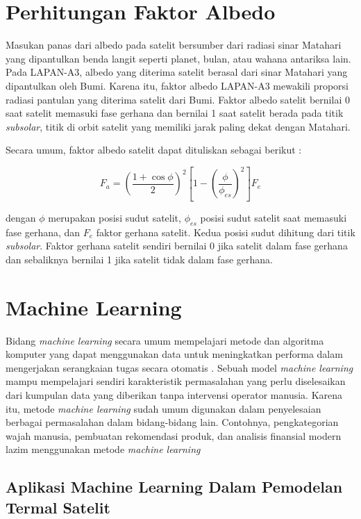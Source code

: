 \section{Perhitungan Faktor Albedo}

Masukan panas dari albedo pada satelit bersumber dari radiasi sinar Matahari
yang dipantulkan benda langit seperti planet, bulan, atau wahana antariksa
lain. Pada LAPAN-A3, albedo yang diterima satelit berasal dari sinar Matahari
yang dipantulkan oleh Bumi. Karena itu, faktor albedo LAPAN-A3 mewakili
proporsi radiasi pantulan yang diterima satelit dari Bumi. Faktor albedo
satelit bernilai 0 saat satelit memasuki fase gerhana dan bernilai 1 saat
satelit berada pada titik \textit{subsolar}, titik di orbit satelit yang
memiliki jarak paling dekat dengan Matahari. 

Secara umum, faktor albedo satelit dapat dituliskan sebagai berikut :

\begin{equation}
\label{eq:albedofactor}
F_a = \left( \frac{1 + \cos{\phi}}{2} \right)^2 \left[ 1 - \left( \frac{\phi}{\phi_{es}} \right)^2 \right] F_e
\end{equation}

dengan $\phi$ merupakan posisi sudut satelit, $\phi_{es}$ posisi sudut satelit
saat memasuki fase gerhana, dan $F_e$ faktor gerhana satelit. Kedua posisi
sudut dihitung dari titik \textit{subsolar}. Faktor gerhana satelit sendiri
bernilai 0 jika satelit dalam fase gerhana dan sebaliknya bernilai 1 jika
satelit tidak dalam fase gerhana.

\section{Machine Learning}

Bidang \textit{machine learning} secara umum mempelajari metode dan
algoritma komputer yang dapat menggunakan data untuk meningkatkan
performa dalam mengerjakan serangkaian tugas secara otomatis
\cite{mitchell1997}. Sebuah model \textit{machine learning} mampu
mempelajari sendiri karakteristik permasalahan yang perlu diselesaikan
dari kumpulan data yang diberikan tanpa intervensi operator manusia.
Karena itu, metode \textit{machine learning} sudah umum digunakan
dalam penyelesaian berbagai permasalahan dalam bidang-bidang lain.
Contohnya, pengkategorian wajah manusia, pembuatan rekomendasi produk,
dan analisis finansial modern lazim menggunakan metode \textit{machine
learning}

\subsection{Aplikasi Machine Learning Dalam Pemodelan Termal Satelit}

